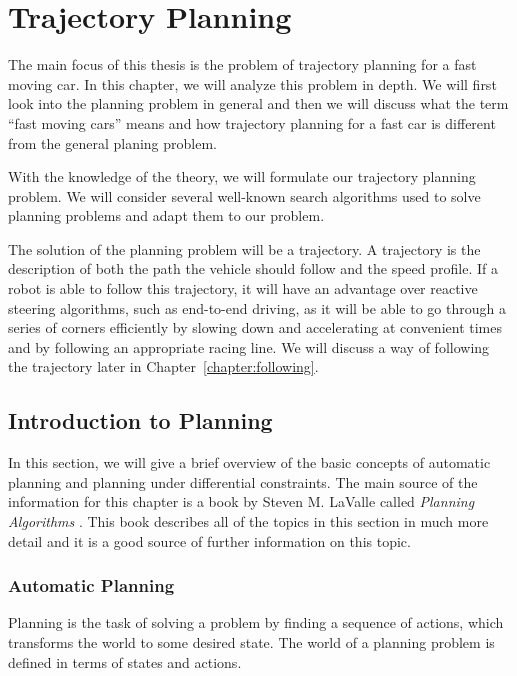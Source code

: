 \chapter{Trajectory Planning}

The main focus of this thesis is the problem of trajectory planning for a fast moving car. In this chapter, we will analyze this problem in depth. We will first look into the planning problem in general and then we will discuss what the term ``fast moving cars'' means and how trajectory planning for a fast car is different from the general planing problem.

With the knowledge of the theory, we will formulate our trajectory planning problem. We will consider several well-known search algorithms used to solve planning problems and adapt them to our problem.

The solution of the planning problem will be a trajectory. A trajectory is the description of both the path the vehicle should follow and the speed profile. If a robot is able to follow this trajectory, it will have an advantage over reactive steering algorithms, such as end-to-end driving, as it will be able to go through a series of corners efficiently by slowing down and accelerating at convenient times and by following an appropriate racing line. We will discuss a way of following the trajectory later in Chapter~\ref{chapter:following}.

\section{Introduction to Planning}

In this section, we will give a brief overview of the basic concepts of automatic planning and planning under differential constraints. The main source of the information for this chapter is a book by Steven M. LaValle called \textit{Planning Algorithms} \cite{lavalle_2006}. This book describes all of the topics in this section in much more detail and it is a good source of further information on this topic.

\subsection{Automatic Planning}

Planning is the task of solving a problem by finding a sequence of actions, which transforms the world to some desired state. The world of a planning problem is defined in terms of states and actions.

